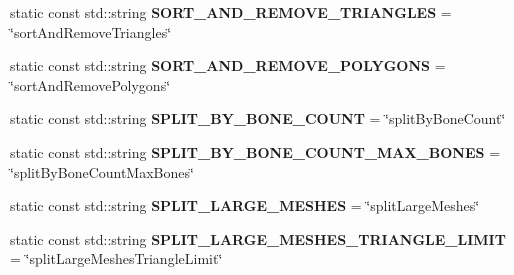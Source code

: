 \begin{DoxyCompactItemize}
\item 
\hypertarget{classrepo_1_1manipulator_1_1modelconvertor_1_1_model_import_config_abc359b43ad4c6541df7db8f5c5fd9e60}{}static const std\+::string {\bfseries S\+O\+R\+T\+\_\+\+A\+N\+D\+\_\+\+R\+E\+M\+O\+V\+E\+\_\+\+T\+R\+I\+A\+N\+G\+L\+E\+S} = \char`\"{}sort\+And\+Remove\+Triangles\char`\"{}\label{classrepo_1_1manipulator_1_1modelconvertor_1_1_model_import_config_abc359b43ad4c6541df7db8f5c5fd9e60}

\item 
\hypertarget{classrepo_1_1manipulator_1_1modelconvertor_1_1_model_import_config_af198b48edbdda3e881807df0e1ac9f50}{}static const std\+::string {\bfseries S\+O\+R\+T\+\_\+\+A\+N\+D\+\_\+\+R\+E\+M\+O\+V\+E\+\_\+\+P\+O\+L\+Y\+G\+O\+N\+S} = \char`\"{}sort\+And\+Remove\+Polygons\char`\"{}\label{classrepo_1_1manipulator_1_1modelconvertor_1_1_model_import_config_af198b48edbdda3e881807df0e1ac9f50}

\item 
\hypertarget{classrepo_1_1manipulator_1_1modelconvertor_1_1_model_import_config_a65171d535961d7cfe9600e04efc8482e}{}static const std\+::string {\bfseries S\+P\+L\+I\+T\+\_\+\+B\+Y\+\_\+\+B\+O\+N\+E\+\_\+\+C\+O\+U\+N\+T} = \char`\"{}split\+By\+Bone\+Count\char`\"{}\label{classrepo_1_1manipulator_1_1modelconvertor_1_1_model_import_config_a65171d535961d7cfe9600e04efc8482e}

\item 
\hypertarget{classrepo_1_1manipulator_1_1modelconvertor_1_1_model_import_config_ace598dc881841bac5b31d39963258329}{}static const std\+::string {\bfseries S\+P\+L\+I\+T\+\_\+\+B\+Y\+\_\+\+B\+O\+N\+E\+\_\+\+C\+O\+U\+N\+T\+\_\+\+M\+A\+X\+\_\+\+B\+O\+N\+E\+S} = \char`\"{}split\+By\+Bone\+Count\+Max\+Bones\char`\"{}\label{classrepo_1_1manipulator_1_1modelconvertor_1_1_model_import_config_ace598dc881841bac5b31d39963258329}

\item 
\hypertarget{classrepo_1_1manipulator_1_1modelconvertor_1_1_model_import_config_a9c0f0fc500d2c9cf97647ec2114809e3}{}static const std\+::string {\bfseries S\+P\+L\+I\+T\+\_\+\+L\+A\+R\+G\+E\+\_\+\+M\+E\+S\+H\+E\+S} = \char`\"{}split\+Large\+Meshes\char`\"{}\label{classrepo_1_1manipulator_1_1modelconvertor_1_1_model_import_config_a9c0f0fc500d2c9cf97647ec2114809e3}

\item 
\hypertarget{classrepo_1_1manipulator_1_1modelconvertor_1_1_model_import_config_a026a2461e11668cc97bdcd51c85f6578}{}static const std\+::string {\bfseries S\+P\+L\+I\+T\+\_\+\+L\+A\+R\+G\+E\+\_\+\+M\+E\+S\+H\+E\+S\+\_\+\+T\+R\+I\+A\+N\+G\+L\+E\+\_\+\+L\+I\+M\+I\+T} = \char`\"{}split\+Large\+Meshes\+Triangle\+Limit\char`\"{}\label{classrepo_1_1manipulator_1_1modelconvertor_1_1_model_import_config_a026a2461e11668cc97bdcd51c85f6578}


\end{DoxyCompactItemize}
